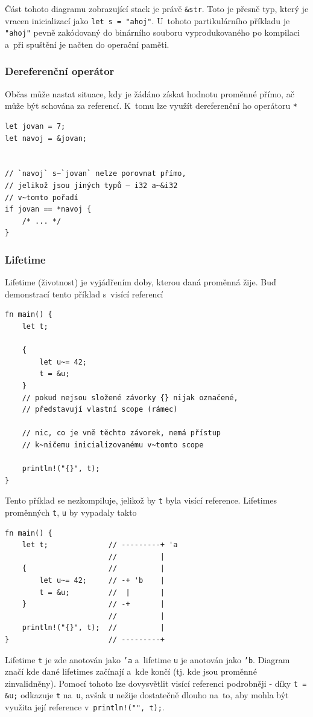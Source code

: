 \documentclass[a4paper, 12pt, twoside]{article} %
\newcommand{\rust}[1]{\texttt{#1}}
\begin{document}
				Část tohoto diagramu zobrazující stack je právě \rust{&str}. Toto je přesně typ, který je vracen inicializací jako \rust{let s~= "ahoj"}. U~tohoto partikulárního příkladu je \rust{"ahoj"} pevně zakódovaný do binárního souboru vyprodukovaného po kompilaci a~při spuštění je načten do operační paměti.

			\subsubsection*{Dereferenční operátor}
				Občas může nastat situace, kdy je žádáno získat hodnotu proměnné přímo, ač může být schována za referencí. K~tomu lze využít dereferenční ho operátoru \rust{*}
				\begin{verbatim} 
let jovan = 7;
let navoj = &jovan;


// `navoj` s~`jovan` nelze porovnat přímo,
// jelikož jsou jiných typů — i32 a~&i32
// v~tomto pořadí
if jovan == *navoj {
	/* ... */
}
				\end{verbatim}
		
			\subsubsection*{Lifetime}
				Lifetime (životnost) je vyjádřením doby, kterou daná proměnná žije. Buď demonstrací tento příklad s~visící referencí
				\begin{verbatim}
fn main() {
	let t;

	{
		let u~= 42;
		t = &u;
	}
	// pokud nejsou složené závorky {} nijak označené,
	// představují vlastní scope (rámec)

	// nic, co je vně těchto závorek, nemá přístup
	// k~ničemu inicializovanému v~tomto scope

	println!("{}", t);
}
				\end{verbatim}
				
				Tento příklad se nezkompiluje, jelikož by \rust{t} byla visící reference. Lifetimes proměnných \rust{t}, \rust{u} by vypadaly takto
				\begin{verbatim}
fn main() {
	let t;              // ---------+ 'a
						//          |
	{                   //          |
		let u~= 42;     // -+ 'b    |
		t = &u;         //  |       |
	}                   // -+       |
						//          |
	println!("{}", t);  //          |
}                       // ---------+
			\end{verbatim}
			
				Lifetime \rust{t} je zde anotován jako \rust{'a} a~lifetime \rust{u} je anotován jako \rust{'b}. Diagram značí kde dané lifetimes začínají a~kde končí (tj. kde jsou proměnné zinvalidněny). Pomocí tohoto lze dovysvětlit visící referenci podrobněji - díky \rust{t = &u;} odkazuje \rust{t} na~\rust{u}, avšak \rust{u} nežije dostatečně dlouho na~to, aby mohla být využita její reference v~\rust{println!("{}", t);}.
				
\end{document}
